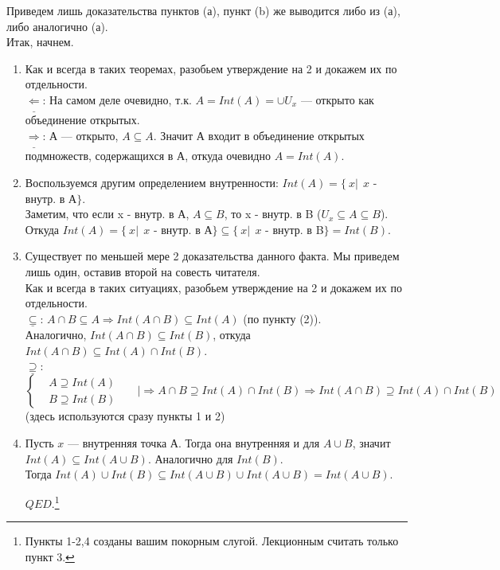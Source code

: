 Приведем лишь доказательства пунктов (а), пункт (b) же выводится либо из (а), либо аналогично (а).
\\ Итак, начнем.
\begin{enumerate}
\item Как и всегда в таких теоремах, разобьем утверждение на 2 и докажем их по отдельности.
\\ $\underline{\Leftarrow}$: На самом деле очевидно, т.к. $A = Int(A) = \cup U_{x}$ --- открыто как объединение открытых.
\\ $\underline{\Rightarrow}$: А --- открыто, $A\subseteq A$. Значит А входит в объединение открытых подмножеств, содержащихся в А, откуда очевидно $A = Int(A)$.
\item Воспользуемся другим определением внутренности: $Int(A) = \lbrace~x|~~x$ - внутр. в А$\rbrace$.
\\ Заметим, что если x - внутр. в А, $A\subseteq B$, то x - внутр. в B ($U_{x}\subseteq A\subseteq B$). Откуда $Int(A) = \lbrace~x|~~x$ - внутр. в А$\rbrace\subseteq\lbrace~x|~~x$ - внутр. в B$\rbrace=Int(B)$.
\item Существует по меньшей мере 2 доказательства данного факта. Мы приведем лишь один, оставив второй на совесть читателя.
\\ Как и всегда в таких ситуациях, разобьем утверждение на 2 и докажем их по отдельности.
\\ $\underline{\subseteq}$: $A\cap B\subseteq A\Longrightarrow Int(A\cap B)\subseteq Int(A)$ (по пункту (2)).
\\Аналогично,  $Int(A\cap B)\subseteq Int(B)$, откуда $Int(A\cap B)\subseteq Int(A)\cap Int(B)$.
\\ $\underline{\supseteq}$: \begin{equation*}
\begin{cases}
    & A\supseteq Int(A)\\
    & B\supseteq Int(B)
 \end{cases}~~~~~~~|\Longrightarrow A\cap B \supseteq Int(A)\cap Int(B)\Longrightarrow Int(A\cap B)\supseteq Int(A)\cap Int(B)
\end{equation*}
(здесь используются сразу пункты 1 и 2)
\item Пусть $x$ --- внутренняя точка А. Тогда она внутренняя и для $A\cup B$, значит $Int(A)\subseteq Int(A\cup B)$. Аналогично для $Int(B)$.
\\ Тогда $Int(A)\cup Int(B)\subseteq Int(A\cup B)\cup Int(A\cup B)=Int(A\cup B)$.
 \begin{flushright}
$QED.$\footnote{Пункты 1-2,4 созданы вашим покорным слугой. Лекционным считать только пункт 3.}
\end{flushright}
\end{enumerate}
